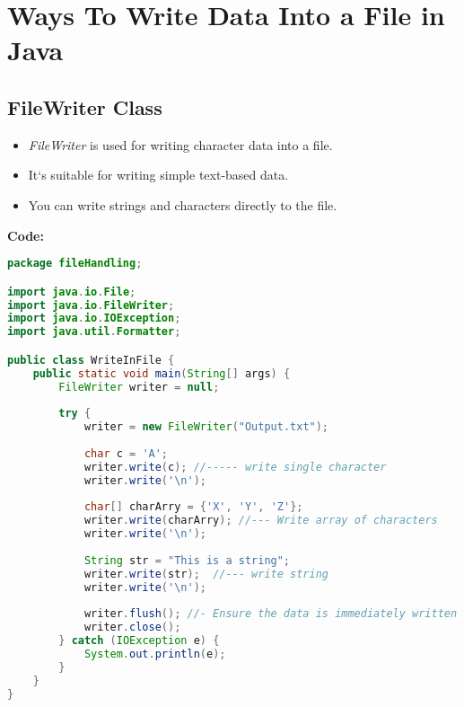 \newpage
\section{Ways To Write Data Into a File in Java}

\subsection{FileWriter Class}
\begin{itemize}
	\item \textit{FileWriter} is used for writing character data into a file.
	\item It`s suitable for writing simple text-based data.
	\item You can write strings and characters directly to the file.
\end{itemize}
\textbf{Code:}
\begin{lstlisting}[language=java]
package fileHandling;

import java.io.File;
import java.io.FileWriter;
import java.io.IOException;
import java.util.Formatter;

public class WriteInFile {
	public static void main(String[] args) {	
		FileWriter writer = null;
		
		try {
			writer = new FileWriter("Output.txt");
			
			char c = 'A';
			writer.write(c); //----- write single character
			writer.write('\n');
			
			char[] charArry = {'X', 'Y', 'Z'};
			writer.write(charArry); //--- Write array of characters
			writer.write('\n');
			
			String str = "This is a string";
			writer.write(str);	//--- write string
			writer.write('\n');
			
			writer.flush(); //- Ensure the data is immediately written to the file
			writer.close();
		} catch (IOException e) {
			System.out.println(e);
		}
	}
}
\end{lstlisting}

\newpage
